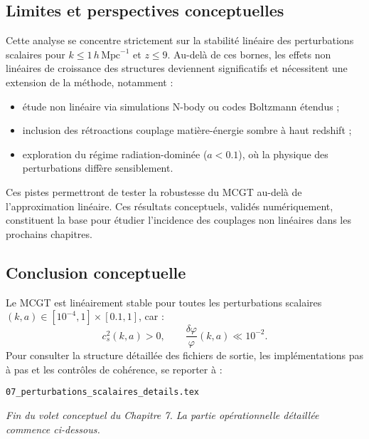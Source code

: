 \subsection*{Limites et perspectives conceptuelles}
Cette analyse se concentre strictement sur la stabilité linéaire des perturbations scalaires pour \(k\le1\,h\,\mathrm{Mpc}^{-1}\) et \(z\le9\).  
Au-delà de ces bornes, les effets non linéaires de croissance des structures deviennent significatifs et nécessitent une extension de la méthode, notamment :
\begin{itemize}
  \item étude non linéaire via simulations N-body ou codes Boltzmann étendus ;  
  \item inclusion des rétroactions couplage matière-énergie sombre à haut redshift ;  
  \item exploration du régime radiation-dominée (\(a<0.1\)), où la physique des perturbations diffère sensiblement.
\end{itemize}
Ces pistes permettront de tester la robustesse du MCGT au-delà de l’approximation linéaire.  
Ces résultats conceptuels, validés numériquement, constituent la base pour étudier l’incidence des couplages non linéaires dans les prochains chapitres. 

\subsection{Conclusion conceptuelle}
Le MCGT est linéairement stable pour toutes les perturbations scalaires \((k,a)\in[10^{-4},1]\times[0.1,1]\), car :
\[
  c_{s}^{2}(k,a) > 0,
  \qquad
  \frac{\delta\varphi}{\varphi}(k,a) \ll 10^{-2}.
\]
Pour consulter la structure détaillée des fichiers de sortie, les implémentations pas à pas et les contrôles de cohérence, se reporter à :
\begin{center}
  \texttt{07\_perturbations\_scalaires\_details.tex}
\end{center}

\noindent\emph{Fin du volet conceptuel du Chapitre 7. La partie opérationnelle détaillée commence ci-dessous.}